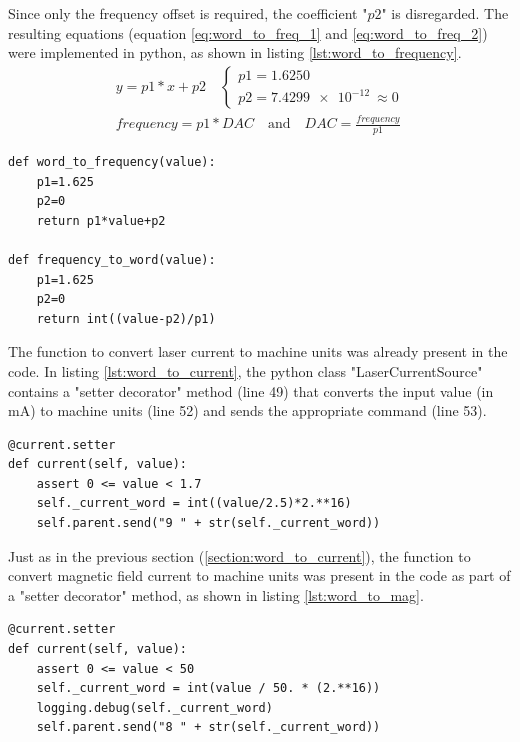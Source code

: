 \documentclass[a4paper,12pt]{article}
\newcounter{subsubsubsection}[subsubsection]
\begin{document}
Since only the frequency offset is required, the coefficient "$p2$" is disregarded. The resulting equations (equation \ref{eq:word_to_freq_1} and \ref{eq:word_to_freq_2}) were implemented in python, as shown in listing \ref{lst:word_to_frequency}.
\begin{align}
y=p1*x+p2\quad
\begin{cases}
p1=1.6250\\ p2=\SI{7.4299e-12}{} \approx 0
\end{cases}
\label{eq:word_to_freq_1}
\\frequency=p1*DAC \quad\text{and}\quad DAC=\frac{frequency}{p1}
\label{eq:word_to_freq_2}
\end{align}
\begin{lstlisting}[style=python,label={lst:word_to_frequency},caption={Python functions to convert machine units to frequency offset (file: misc.py).},firstnumber=171]
def word_to_frequency(value):
    p1=1.625
    p2=0
    return p1*value+p2

def frequency_to_word(value):
    p1=1.625
    p2=0
    return int((value-p2)/p1)
\end{lstlisting}

\label{section:word_to_current}
The function to convert laser current to machine units was already present in the code. In listing \ref{lst:word_to_current}, the python class "LaserCurrentSource" contains a "setter decorator" method (line 49) that converts the input value (in mA) to machine units (line 52) and sends the appropriate command (line 53).

\begin{lstlisting}[style=python,label={lst:word_to_current},caption={Python function to convert laser current to machine units (file: mac\_device.py).},firstnumber=49]
@current.setter
def current(self, value):
    assert 0 <= value < 1.7
    self._current_word = int((value/2.5)*2.**16)
    self.parent.send("9 " + str(self._current_word))
\end{lstlisting}

Just as in the previous section (\ref{section:word_to_current}), the function to convert magnetic field current to machine units was present in the code as part of a "setter decorator" method, as shown in listing \ref{lst:word_to_mag}.

\begin{lstlisting}[style=python,label={lst:word_to_mag},caption={Python function to convert magnetic field current to machine units (file: mac\_device.py).},firstnumber=65]
@current.setter
def current(self, value):
    assert 0 <= value < 50
    self._current_word = int(value / 50. * (2.**16))
    logging.debug(self._current_word)
    self.parent.send("8 " + str(self._current_word))
\end{lstlisting}
\end{document}

